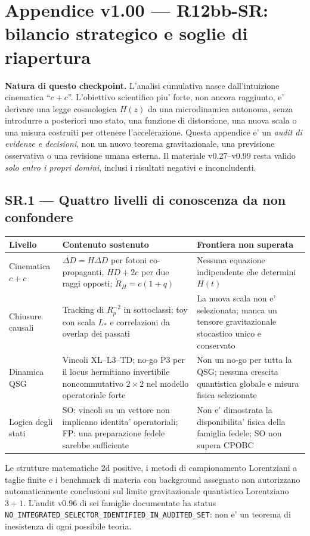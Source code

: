 \documentclass[11pt,a4paper]{article}
\begin{document}
\section*{Appendice v1.00 --- R12bb-SR: bilancio strategico e soglie di riapertura}
\textbf{Natura di questo checkpoint.} L'analisi cumulativa nasce dall'intuizione cinematica ``$c+c$''. L'obiettivo scientifico piu' forte, non ancora raggiunto, e' derivare una legge cosmologica $H(z)$ da una microdinamica autonoma, senza introdurre a posteriori uno stato, una funzione di distorsione, una nuova scala o una misura costruiti per ottenere l'accelerazione. Questa appendice e' un \emph{audit di evidenze e decisioni}, non un nuovo teorema gravitazionale, una previsione osservativa o una revisione umana esterna. Il materiale v0.27--v0.99 resta valido \emph{solo entro i propri domini}, inclusi i risultati negativi e inconcludenti.

\subsection*{SR.1 --- Quattro livelli di conoscenza da non confondere}
\begin{center}
\footnotesize
\renewcommand{\arraystretch}{1.12}
\begin{tabular}{p{2.85cm}p{6.1cm}p{5.05cm}}
\toprule
\textbf{Livello} & \textbf{Contenuto sostenuto} & \textbf{Frontiera non superata}\\\midrule
Cinematica $c+c$ & $\dot{\Delta D}=H\Delta D$ per fotoni co-propaganti, $HD+2c$ per due raggi opposti; $\dot R_H=c(1+q)$ & Nessuna equazione indipendente che determini $H(t)$ \\
Chiusure causali & Tracking di $R_p^{-2}$ in sottoclassi; toy con scala $L_*$ e correlazioni da overlap dei passati & La nuova scala non e' selezionata; manca un tensore gravitazionale stocastico unico e conservato \\
Dinamica QSG & Vincoli XL--L3--TD; no-go P3 per il locus hermitiano invertibile noncommutativo $2\times2$ nel modello operatoriale forte & Non un no-go per tutta la QSG; nessuna crescita quantistica globale e misura fisica selezionate \\
Logica degli stati & SO: vincoli su un vettore non implicano identita' operatoriali; FP: una preparazione fedele sarebbe sufficiente & Non e' dimostrata la disponibilita' fisica della famiglia fedele; SO non supera CPOBC \\
\bottomrule
\end{tabular}
\end{center}
Le strutture matematiche 2d positive, i metodi di campionamento Lorentziani a taglie finite e i benchmark di materia con background assegnato non autorizzano automaticamente conclusioni sul limite gravitazionale quantistico Lorentziano $3+1$. L'audit v0.96 di sei famiglie documentate ha status \texttt{NO\_INTEGRATED\_SELECTOR\_IDENTIFIED\_IN\_AUDITED\_SET}: non e' un teorema di inesistenza di ogni possibile teoria.
\end{document}
